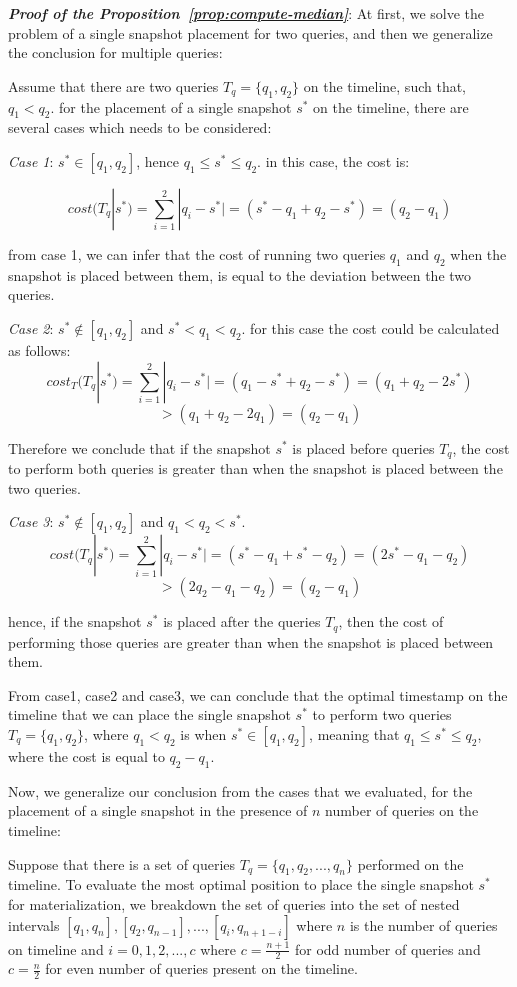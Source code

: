 		\textbf{\emph{Proof of the Proposition~\ref{prop:compute-median}}}:
			At first, we solve the problem of a single snapshot placement for two queries, and then we generalize the conclusion for multiple queries:

			Assume that there are two queries $T_q=\{q_1,q_2 \}$ on the timeline, such that, $q_1<q_2$. for the placement of a single snapshot $s^*$ on the timeline, there are several cases which needs to be considered:

			\emph{Case 1}:
			$s^* \in [q_1,q_2]$, hence $q_1\leq s^*\leq q_2$.
			in this case, the cost is:

			$$cost(T_q|s^*)=\sum_{i=1}^2|q_i-s^*| = (s^*-q_1+q_2-s^*)=(q_2-q_1)$$

			from case 1, we can infer that the cost of running two queries $q_1$ and $q_2$ when the snapshot is placed between them, is equal to the deviation between the two queries.

			\emph{Case 2}:
			$s^* \notin [q_1,q_2]$ and $s^* < q_1 < q_2$. for this case the cost could be calculated as follows:
			$$cost_T(T_q|s^*)=\sum_{i=1}^2|q_i-s^*| = (q_1-s^*+q_2-s^*)=(q_1+q_2-2s^*) $$$$>(q_1+q_2-2q_1)=(q_2-q_1)$$

			Therefore we conclude that if the snapshot $s^*$ is placed before queries $T_q$, the cost to perform both queries is greater than when the snapshot is placed between the two queries.

			\emph{Case 3}:
			$s^* \notin [q_1,q_2]$ and $q_1 < q_2 < s^*$.
			$$cost(T_q|s^*)=\sum_{i=1}^2|q_i-s^*| = (s^*-q_1+s^*-q_2)=(2s^*-q_1-q_2) $$$$>(2q_2-q_1-q_2)=(q_2-q_1)$$

			hence, if the snapshot $s^*$ is placed after the queries $T_q$, then the cost of performing those queries are greater than when the snapshot is placed between them.

			From case1, case2 and case3, we can conclude that the optimal timestamp on the timeline that we can place the single snapshot $s^*$ to perform two queries $T_q = \{q_1,q_2\}$, where $q_1<q_2$ is when $s^* \in [q_1,q_2]$, meaning that $q_1 \leq s^* \leq q_2$, where the cost is equal to $q_2-q_1$.

			Now, we generalize our conclusion from the cases that we evaluated, for the placement of a single snapshot in the presence of $n$ number of queries on the timeline: 

			Suppose that there is a set of queries $T_q=\{q_1,q_2,...,q_n\}$ performed on the timeline. To evaluate the most optimal position to place the single snapshot $s^*$ for materialization, we breakdown the set of queries into the set of nested intervals $[q_1,q_n],[q_2,q_{n-1}],...,[q_i,q_{n+1-i}]$ where $n$ is the number of queries on timeline and $i=0,1,2,...,c$ where $c=\frac{n+1}{2}$ for odd number of queries and $c=\frac{n}{2}$ for even number of queries present on the timeline.

